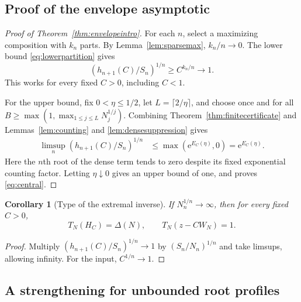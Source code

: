 \documentclass[11pt,a4paper]{article}
\numberwithin{equation}{section}
\newtheorem{corollary}[theorem]{Corollary}
\theoremstyle{definition}
\theoremstyle{remark}
\newcommand{\Type}{T_N}
\newcommand{\ee}{\mathrm e}
\begin{document}
\subsection{Proof of the envelope asymptotic}

\begin{proof}[Proof of Theorem~\ref{thm:envelopeintro}]
For each $n$, select a maximizing composition with $k_n$ parts. By
Lemma~\ref{lem:sparsemax}, $k_n/n\to0$. The lower bound
\eqref{eq:lowerpartition} gives
\[
 \left(h_{n+1}(C)/S_n\right)^{1/n}\ge C^{k_n/n}\longrightarrow1.
\]
This works for every fixed $C>0$, including $C<1$.

For the upper bound, fix $0<\eta\le1/2$, let
$L=\lceil2/\eta\rceil$, and choose once and for all
$B\ge\max(1,\max_{1\le j\le L}N_j^{1/j})$. Combining
Theorem~\ref{thm:finitecertificate} and Lemmas~\ref{lem:counting} and
\ref{lem:densesuppression} gives
\begin{align*}
 \limsup_n\left(h_{n+1}(C)/S_n\right)^{1/n}
 &\le\max\left(\ee^{E_C(\eta)},0\right)
 =\ee^{E_C(\eta)}.
\end{align*}
Here the $n$th root of the dense term tends to zero despite its fixed
exponential counting factor. Letting $\eta\downarrow0$ gives an upper
bound of one, and proves \eqref{eq:central}.
\end{proof}

\begin{corollary}[Type of the extremal inverse]
\label{cor:extremaltype}
If $N_n^{1/n}\to\infty$, then for every fixed $C>0$,
\begin{equation}
 \Type(H_C)=\Delta(N),\qquad \Type(z-CW_N)=1.
 \label{eq:extremaltype}
\end{equation}
\end{corollary}
\begin{proof}
Multiply $(h_{n+1}(C)/S_n)^{1/n}\to1$ by
$(S_n/N_n)^{1/n}$ and take limsups, allowing infinity. For the input,
$C^{1/n}\to1$.
\end{proof}

\subsection{A strengthening for unbounded root profiles}
\end{document}
